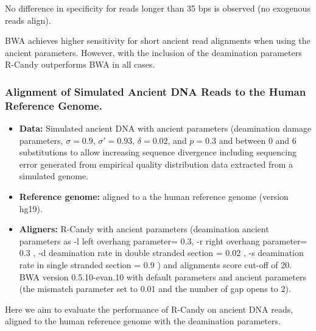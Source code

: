 \documentclass[11pt,a4paper]{report}
\begin{document}
No difference in specificity for reads longer than 35 bps is observed (no exogenous 
reads align).

BWA achieves higher sensitivity for short ancient read alignments when using the 
ancient parameters. However, with the inclusion of the deamination parameters 
R-Candy outperforms BWA in all cases.





\subsubsection{Alignment of Simulated Ancient DNA Reads to the Human Reference Genome.}
\label{Alignment of Simulated Ancient DNA Reads to the Human Reference Genome.}
 
 \begin{itemize}
 
    \item \textbf{Data:} Simulated ancient DNA 
     with ancient parameters (deamination damage parameters, $ \sigma = 0.9$, 
    $ \sigma' = 0.93 $, $\delta = 0.02 $,  and $p = 0.3 $ and 
    between 0 and 6 substitutions to allow increasing sequence divergence
    including sequencing error generated from empirical quality distribution data
    extracted from a simulated genome.
  
   \item \textbf{Reference genome:} aligned to a the human reference genome (version hg19).

 
    \item \textbf{Aligners:} 
R-Candy with ancient parameters 
(deamination ancient parameters as -l left overhang parameter= 0.3, -r 
right overhang parameter= 0.3 , 
-d deamination rate in double stranded section = 0.02 , 
-s deamination rate in single stranded section = 0.9 )
and alignments score cut-off of 20. \\
BWA version 0.5.10-evan.10 with default parameters and ancient parameters 
(the mismatch parameter set to 0.01 
and the number of gap opens to 2)\cite{green2010draft}.
 
  \end{itemize}
 

Here we aim to evaluate the performance of R-Candy on ancient DNA reads, 
aligned to the human reference genome with the deamination parameters.
\end{document}
